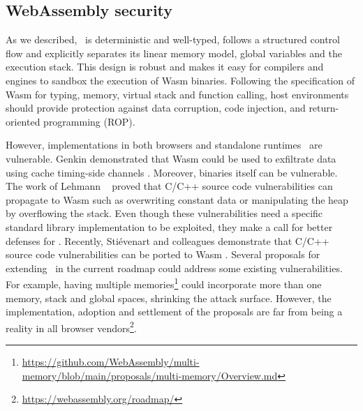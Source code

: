 







\subsection{WebAssembly security}

As we described, \wasm\ is deterministic and well-typed, follows a structured control flow and explicitly separates its linear memory model, global variables and the execution stack. This design is robust \cite{WebAssemblySecurity} and makes it easy for compilers and engines to sandbox the execution of Wasm  binaries. Following the specification of Wasm  for typing, memory, virtual stack and function calling,
host environments should provide protection against data corruption, code injection, and return-oriented programming (ROP).

However, implementations in both browsers and standalone runtimes~\cite{Narayan2021Swivel} are vulnerable.
Genkin \etal demonstrated that Wasm  could be used to exfiltrate data using cache timing-side channels \cite{Genkin2018DrivebyKC}.
Moreover, binaries itself can be vulnerable. The work of Lehmann \etal ~\cite{usenixWasm2020} proved that C/C++ source code vulnerabilities can propagate to Wasm  such as overwriting constant data or manipulating the heap by overflowing the stack. Even though these vulnerabilities need a specific standard library implementation to be exploited, they make a call for better defenses for \wasm. 
Recently, Stiévenart and colleagues demonstrate that C/C++ source code vulnerabilities can be ported to Wasm \cite{DeRoover2022}.
Several proposals for extending \wasm\ in the current roadmap could address some existing vulnerabilities. For example, having multiple memories\footnote{\url{https://github.com/WebAssembly/multi-memory/blob/main/proposals/multi-memory/Overview.md}} could incorporate more than one memory, stack and global spaces, shrinking the attack surface. However, the implementation, adoption and settlement of the proposals are far from being a reality in all browser vendors\footnote{\url{https://webassembly.org/roadmap/}}. 
